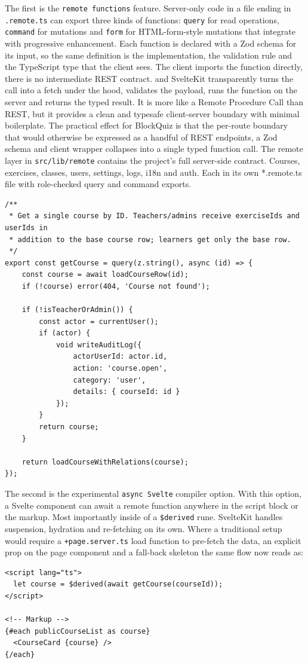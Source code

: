 The first is the \texttt{remote functions} \cite{svelte-remote} feature. Server-only code in a file ending in \texttt{.remote.ts} can export three kinds of functions:
\texttt{query} for read operations, \texttt{command} for mutations and \texttt{form} for HTML-form-style mutations that integrate with
progressive enhancement. Each function is declared with a Zod schema for its input, so the same definition is the implementation,
the validation rule and the TypeScript type that the client sees. The client imports the function directly, there is no intermediate REST contract.
and SvelteKit transparently turns the call into a fetch under the hood, validates the payload, runs the function on the server and returns the typed result.
It is more like a Remote Procedure Call than REST, but it provides a clean and typesafe client-server boundary with minimal boilerplate.
The practical effect for BlockQuiz is that the per-route boundary that would otherwise be expressed as a handful of REST endpoints,
a Zod schema and client wrapper collapses into a single typed function call.
The remote layer in \texttt{src/lib/remote} contains the project's full server-side contract.
Courses, exercises, classes, users, settings, logs, i18n and auth. Each in its own *.remote.ts file with role-checked query and command exports.
\begin{lstlisting}[style=svelte, caption={SvelteKit Remote Function Example}]
/**
 * Get a single course by ID. Teachers/admins receive exerciseIds and userIds in
 * addition to the base course row; learners get only the base row.
 */
export const getCourse = query(z.string(), async (id) => {
	const course = await loadCourseRow(id);
	if (!course) error(404, 'Course not found');

	if (!isTeacherOrAdmin()) {
		const actor = currentUser();
		if (actor) {
			void writeAuditLog({
				actorUserId: actor.id,
				action: 'course.open',
				category: 'user',
				details: { courseId: id }
			});
		}
		return course;
	}

	return loadCourseWithRelations(course);
});
\end{lstlisting}

The second is the experimental \texttt{async Svelte} \cite{svelte-async} compiler option.
With this option, a Svelte component can await a remote function anywhere in the script block or the markup.
Most importantly inside of a \texttt{\$derived} rune. SvelteKit handles suspension, hydration and re-fetching on its own.
Where a traditional setup would require a \texttt{+page.server.ts} load function to pre-fetch the data, an explicit prop on the page component
and a fall-back skeleton the same flow now reads as:
\begin{lstlisting}[style=svelte, caption={Async Svelte Data Fetching}]
<script lang="ts">
  let course = $derived(await getCourse(courseId));
</script>

<!-- Markup -->
{#each publicCourseList as course}
  <CourseCard {course} />
{/each}
\end{lstlisting}

